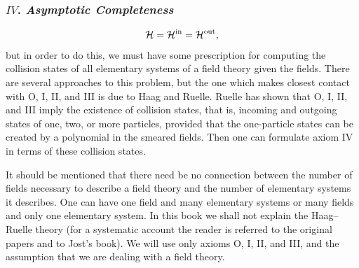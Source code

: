 \subsubsection*{$IV$. \emph{Asymptotic Completeness}}
\begin{equation*}
  \mathcal{H}=\mathcal{H}^{\mathrm{in}}=\mathcal{H}^{\mathrm{out}},
\end{equation*}
but in order to do this, we must have some prescription for computing the
collision states of all elementary systems of a field theory given the fields.
There are several approaches to this problem, but the one which makes closest
contact with O, I, II, and III is due to Haag and Ruelle. Ruelle has shown
that O, I, II, and III imply the existence of collision states, that is,
incoming and outgoing states of one, two, or more particles, provided that the
one-particle states can be created by a polynomial in the smeared fields. Then
one can formulate axiom IV in terms of these collision states.

It should be mentioned that there need be no connection between the number of
fields necessary to describe a field theory and the number of elementary
systems it describes. One can have one field and many elementary systems or
many fields and only one elementary system. In this book we shall not explain
the Haag--Ruelle theory (for a systematic account the reader is referred to
the original papers and to Jost's book). We will use only axioms O, I, II, and
III, and the assumption that we are dealing with a field theory.

